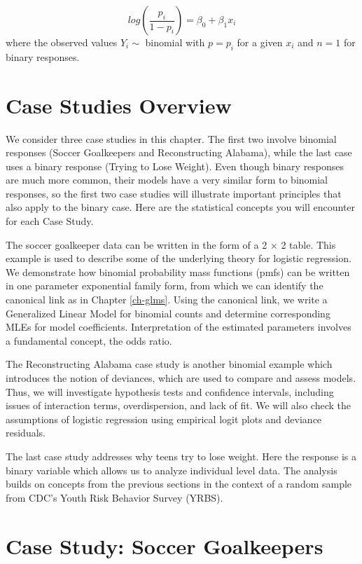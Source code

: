 \documentclass[
]{krantz}
\begin{document}
\begin{equation*}
log(\frac{p_i}{1-p_i})=\beta_0+\beta_1 x_i
\end{equation*}
where the observed values \(Y_i \sim\) binomial with \(p=p_i\) for a given \(x_i\) and \(n=1\) for binary responses.

\hypertarget{case-studies-overview-1}{%
\section{Case Studies Overview}\label{case-studies-overview-1}}

We consider three case studies in this chapter. The first two involve binomial responses (Soccer Goalkeepers and Reconstructing Alabama), while the last case uses a binary response (Trying to Lose Weight). Even though binary responses are much more common, their models have a very similar form to binomial responses, so the first two case studies will illustrate important principles that also apply to the binary case. Here are the statistical concepts you will encounter for each Case Study.

The soccer goalkeeper data can be written in the form of a 2 \(\times\) 2 table. This example is used to describe some of the underlying theory for logistic regression. We demonstrate how binomial probability mass functions (pmfs) can be written in one parameter exponential family form, from which we can identify the canonical link as in Chapter \ref{ch-glms}. Using the canonical link, we write a Generalized Linear Model for binomial counts and determine corresponding MLEs for model coefficients. Interpretation of the estimated parameters involves a fundamental concept, the odds ratio.

The Reconstructing Alabama case study is another binomial example which introduces the notion of deviances, which are used to compare and assess models. Thus, we will investigate hypothesis tests and confidence intervals, including issues of interaction terms, overdispersion, and lack of fit. We will also check the assumptions of logistic regression using empirical logit plots and deviance residuals.

The last case study addresses why teens try to lose weight. Here the response is a binary variable which allows us to analyze individual level data. The analysis builds on concepts from the previous sections in the context of a random sample from CDC's Youth Risk Behavior Survey (YRBS).

\hypertarget{case-study-soccer-goalkeepers}{%
\section{Case Study: Soccer Goalkeepers}\label{case-study-soccer-goalkeepers}}
\end{document}
